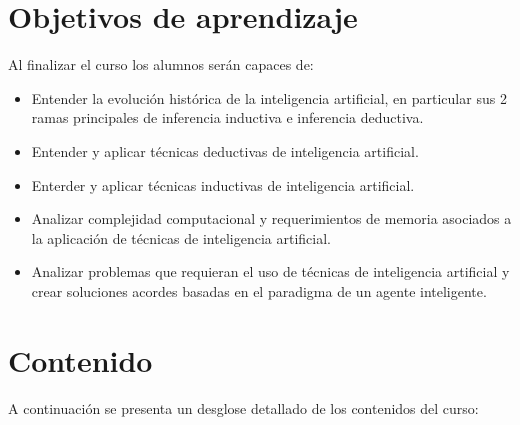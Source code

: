 \documentclass[11pt,letterpaper]{article}
\begin{document}
\section{Objetivos de aprendizaje}
Al finalizar el curso los alumnos serán capaces de:
\begin{itemize}
  \item Entender la evolución histórica de la inteligencia artificial, en
    particular sus 2 ramas principales de inferencia inductiva e inferencia
    deductiva.
  \item Entender y aplicar técnicas deductivas de inteligencia artificial.
  \item Enterder y aplicar técnicas inductivas de inteligencia artificial.
  \item Analizar complejidad computacional y requerimientos de memoria asociados
    a la aplicación de técnicas de inteligencia artificial.
  \item Analizar problemas que requieran el uso de técnicas de inteligencia
    artificial y crear soluciones acordes basadas en el paradigma de un agente
    inteligente.
\end{itemize}

\section{Contenido}
A continuación se presenta un desglose detallado de los contenidos del curso:
\end{document}
